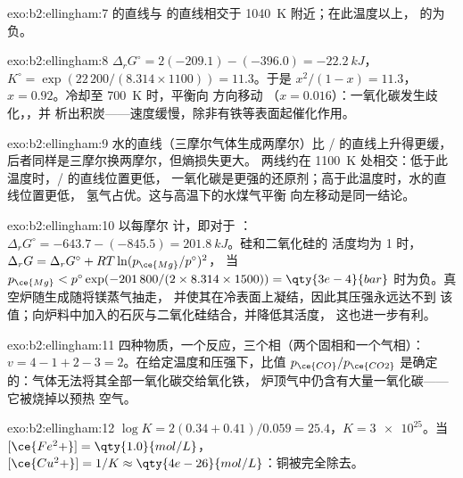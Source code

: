 \begin{solution}{exo:b2:ellingham:7}
 的直线与  的直线相交于
\qty{1040}{K} 附近；在此温度以上， 的为负。
\end{solution}

\begin{solution}{exo:b2:ellingham:8}
$\Delta_r G^\circ = 2(-209.1) - (-396.0) = \qty{-22.2}{kJ}$，$K^\circ =
\exp(22\,200/(8.314 \times 1100)) = 11.3$。于是 $x^2/(1 - x) = 11.3$，$x =
0.92$。冷却至 \qty{700}{K} 时，平衡向  方向移动
（$x = 0.016$）：一氧化碳发生歧化，，并
析出积炭——速度缓慢，除非有铁等表面起催化作用。
\end{solution}

\begin{solution}{exo:b2:ellingham:9}
水的直线（三摩尔气体生成两摩尔）比
/ 的直线上升得更缓，后者同样是三摩尔换两摩尔，但熵损失更大。
两线约在 \qty{1100}{K} 处相交：低于此温度时，/ 的直线位置更低，
一氧化碳是更强的还原剂；高于此温度时，水的直线位置更低，
氢气占优。这与高温下的水煤气平衡
 向左移动是同一结论。
\end{solution}

\begin{solution}{exo:b2:ellingham:10}
以每摩尔  计，即对于 ：$\Delta_r
G^\circ = -643.7 - (-845.5) = \qty{+201.8}{kJ}$。硅和二氧化硅的
活度均为 1 时，$\Delta_r G = \Delta_r G^\circ + RT\ln(p_{\ce{Mg}}/p^\circ)^2$，
当 $p_{\ce{Mg}} < p^\circ\exp(-201\,800/(2 \times 8.314 \times 1500)) =
\qty{3e-4}{bar}$ 时为负。真空炉随生成随将镁蒸气抽走，
并使其在冷表面上凝结，因此其压强永远达不到
该值；向炉料中加入的石灰与二氧化硅结合，并降低其活度，
这也进一步有利。
\end{solution}

\begin{solution}{exo:b2:ellingham:11}
四种物质，一个反应，三个相（两个固相和一个气相）：$v = 4 - 1 +
2 - 3 = 2$。在给定温度和压强下，比值 $p_{\ce{CO}}/p_{\ce{CO2}}$
是确定的：气体无法将其全部一氧化碳交给氧化铁，
炉顶气中仍含有大量一氧化碳——它被烧掉以预热
空气。
\end{solution}

\begin{solution}{exo:b2:ellingham:12}
$\log K = 2(0.34 + 0.41)/0.059 = 25.4$，$K = \num{3e25}$。当
$[\ce{Fe^2+}] = \qty{1.0}{mol/L}$，$[\ce{Cu^2+}] = 1/K \approx
\qty{4e-26}{mol/L}$：铜被完全除去。
\end{solution}

